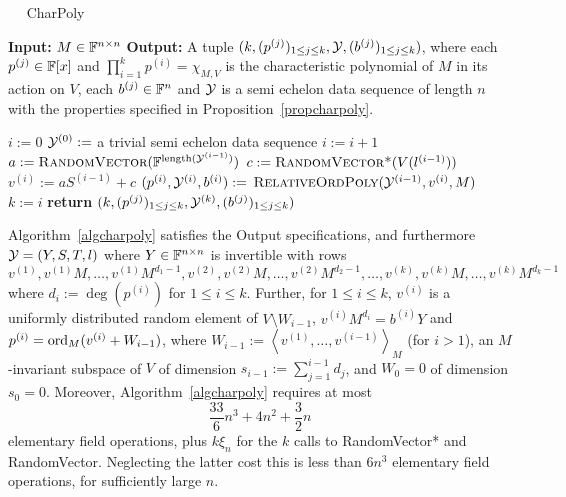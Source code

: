 \begin{algorithm}
\caption{$\quad$ \sc CharPoly}
\label{algcharpoly}
\begin{algorithmic}
\STATE \textbf{Input:} $M \in \mathbb{F}^{n\times n}$
\STATE \textbf{Output:} 
A tuple $(k, (p^{(j)})_{1\leq j\leq k}, \mathcal{Y}, (b^{(j)})_{1\leq j\leq
k})$, where  each $p^{(j)}\in\mathbb{F}[x]$ and $\prod_{i=1}^k p^{(i)} =
\chi_{M,V}$ is the characteristic polynomial
of $M$ in its action on $V$,  each  $b^{(j)}\in\mathbb{F}^n$ and $\mathcal{Y}$ is a
semi echelon data sequence of length $n$ with the properties
specified in Proposition~\ref{propcharpoly}.

\vspace*{2mm}
\STATE $i := 0$
\STATE $\mathcal{Y}^{(0)}:=$ a trivial semi echelon data sequence
    \STATE $i := i + 1$
    \STATE $a := \mbox{\sc RandomVector}(\mathbb{F}^{\mathrm{length}(\mathcal{Y}^{(i-1)})})$
    \STATE $c := \mbox{\sc RandomVector*}(V(l^{(i-1)}))$
    \STATE $v^{(i)} := aS^{(i-1)} + c$
	\STATE 
       \hspace*{10mm} 
    \STATE $(p^{(i)},\mathcal{Y}^{(i)},b^{(i)}) :=$
             $\mbox{\sc RelativeOrdPoly}(\mathcal{Y}^{(i-1)},v^{(i)},M)$
\STATE  \hspace*{10mm} 
\ENDWHILE
\STATE $k := i$
\STATE \textbf{return} $(k,(p^{(j)})_{1 \le j \le k}, 
                       \mathcal{Y}^{(k)}, 
(b^{(j)})_{1 \le j \le k})$
\end{algorithmic}
\end{algorithm}

\begin{Prop}
\label{propcharpoly}\mbox{}
Algorithm~\ref{algcharpoly} satisfies
the Output specifications, and furthermore
$\mathcal{Y}=(Y,S,T,l)$ where
$Y \in \mathbb{F}^{n \times n}$ is invertible with rows
\[ v\!^{(1)}, v\!^{(1)}M, \ldots, v\!^{(1)}M^{d_1-1}, 
v\!^{(2)}, v\!^{(2)}M, \ldots, v\!^{(2)}M^{d_2-1},
   \ldots, v\!^{(k)}, v\!^{(k)}M, \ldots, v\!^{(k)} M^{d_k-1} 
\]
where $d_i := \deg(p^{(i)})$ for $1 \le i \le k$. Further, for $1 \le i \le k$,
$v^{(i)}$ is a uniformly distributed random element of\/ $V\setminus W_{i-1}$, 
$v^{(i)} M^{d_i} = b^{(i)} Y$ and $p^{(i)} = \mathrm{ord}_M(v^{(i)} + W_{i-1})$,
where $W_{i-1} := \left< v^{(1)}, \ldots, v^{(i-1)}\right>_M$ (for $i>1$), 
an $M$-invariant subspace of $V$ of dimension $s_{i-1}:=\sum_{j=1}^{i-1} d_j$, and 
$W_0=0$ of dimension $s_0=0$.
Moreover, Algorithm~\ref{algcharpoly} requires at most
\[
\frac{33}{6}n^3+4n^2+\frac{3}{2}n 
\]
elementary field operations, plus
$k\xi_{n}$ for the $k$ calls to {\sc RandomVector*} and {\sc RandomVector}. Neglecting 
the latter cost this  is less than $6n^3$ elementary field operations, for sufficiently large $n$.
\end{Prop}


